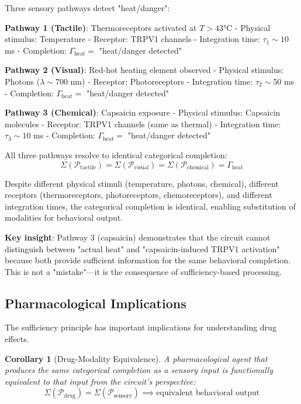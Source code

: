 \documentclass[aps,prd,twocolumn,superscriptaddress,floatfix,nofootinbib]{revtex4-2}
\newtheorem{corollary}[theorem]{Corollary}
\theoremstyle{remark}
\begin{document}
\begin{example}
\label{ex:heat_multimodal}
Three sensory pathways detect "heat/danger":

\textbf{Pathway 1 (Tactile)}: Thermoreceptors activated at $T > 43°$C
- Physical stimulus: Temperature
- Receptor: TRPV1 channels
- Integration time: $\tau_1 \sim 10$ ms
- Completion: $\Gamma_{\text{heat}} = $ "heat/danger detected"

\textbf{Pathway 2 (Visual)}: Red-hot heating element observed
- Physical stimulus: Photons ($\lambda \sim 700$ nm)
- Receptor: Photoreceptors
- Integration time: $\tau_2 \sim 50$ ms
- Completion: $\Gamma_{\text{heat}} = $ "heat/danger detected"

\textbf{Pathway 3 (Chemical)}: Capsaicin exposure
- Physical stimulus: Capsaicin molecules
- Receptor: TRPV1 channels (same as thermal)
- Integration time: $\tau_3 \sim 10$ ms
- Completion: $\Gamma_{\text{heat}} = $ "heat/danger detected"

All three pathways resolve to identical categorical completion:
$$
\Sigma(\mathcal{P}_{\text{tactile}}) = \Sigma(\mathcal{P}_{\text{visual}}) = \Sigma(\mathcal{P}_{\text{chemical}}) = \Gamma_{\text{heat}}
$$

Despite different physical stimuli (temperature, photons, chemical), different receptors (thermoreceptors, photoreceptors, chemoreceptors), and different integration times, the categorical completion is identical, enabling substitution of modalities for behavioral output.

\textbf{Key insight}: Pathway 3 (capsaicin) demonstrates that the circuit cannot distinguish between "actual heat" and "capsaicin-induced TRPV1 activation" because both provide sufficient information for the same behavioral completion. This is not a "mistake"—it is the consequence of sufficiency-based processing.
\end{example}

\subsection{Pharmacological Implications}

The sufficiency principle has important implications for understanding drug effects.

\begin{corollary}[Drug-Modality Equivalence]
\label{cor:drug_equivalence}
A pharmacological agent that produces the same categorical completion as a sensory input is functionally equivalent to that input from the circuit's perspective:
\begin{equation}
\Sigma(\mathcal{P}_{\text{drug}}) = \Sigma(\mathcal{P}_{\text{sensory}}) \implies \text{equivalent behavioral output}
\end{equation}
\end{corollary}
\end{document}
